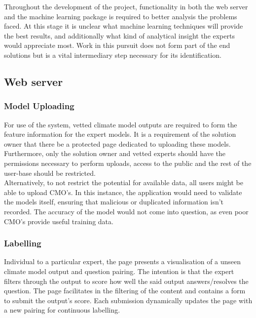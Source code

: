 \documentclass{ecmm427_assignment}
\begin{document}
Throughout the development of the project, functionality in both the web server and the machine learning package is required to better analysis the problems faced. At this stage it is unclear what machine learning techniques will provide the best results, and additionally what kind of analytical insight the experts would appreciate most. Work in this pursuit does not form part of the end solutions but is a vital intermediary step necessary for its identification.

\subsection{Web server}

\subsubsection{Model Uploading}

For use of the system, vetted climate model outputs are required to form the feature information for the expert models. It is a requirement of the solution owner that there be a protected page dedicated to uploading these models. Furthermore, only the solution owner and vetted experts should have the permissions necessary to perform uploads, access to the public and the rest of the user-base should be restricted.\\

\noindent Alternatively, to not restrict the potential for available data, all users might be able to upload CMO's. In this instance, the application would need to validate the models itself, ensuring that malicious or duplicated information isn't recorded. The accuracy of the model would not come into question, as even poor CMO's provide useful training data.

\subsubsection{Labelling}

Individual to a particular expert, the page presents a visualisation of a unseen climate model output and question pairing. The intention is that the expert filters through the output to score how well the said output answers/resolves the question. The page facilitates in the filtering of the content and contains a form to submit the output's score. Each submission dynamically updates the page with a new pairing for continuous labelling.\\
\end{document}
